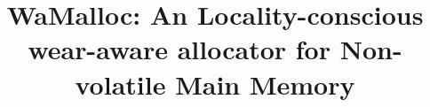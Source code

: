 \documentclass{vldb}
\begin{document}

\title{WaMalloc: An Locality-conscious wear-aware allocator for Non-volatile Main Memory}



%
%
%
%

\end{document}
